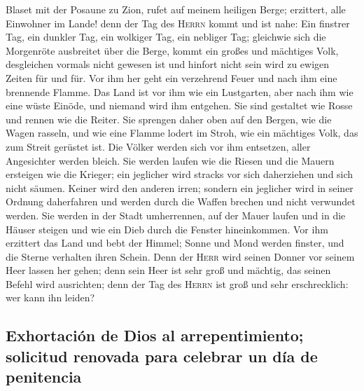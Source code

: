  Blaset mit der Posaune zu Zion, rufet auf meinem heiligen
Berge; erzittert, alle Einwohner im Lande! denn der Tag des
\textsc{Herrn} kommt und ist nahe:  Ein finstrer Tag, ein
dunkler Tag, ein wolkiger Tag, ein nebliger Tag; gleichwie sich die
Morgenröte ausbreitet über die Berge, kommt ein großes und mächtiges
Volk, desgleichen vormals nicht gewesen ist und hinfort nicht sein wird
zu ewigen Zeiten für und für.  Vor ihm her geht ein
verzehrend Feuer und nach ihm eine brennende Flamme. Das Land ist vor
ihm wie ein Lustgarten, aber nach ihm wie eine wüste Einöde, und niemand
wird ihm entgehen.  Sie sind gestaltet wie Rosse und
rennen wie die Reiter.  Sie sprengen daher oben auf den
Bergen, wie die Wagen rasseln, und wie eine Flamme lodert im Stroh, wie
ein mächtiges Volk, das zum Streit gerüstet ist.  Die
Völker werden sich vor ihm entsetzen, aller Angesichter werden bleich.
 Sie werden laufen wie die Riesen und die Mauern ersteigen
wie die Krieger; ein jeglicher wird stracks vor sich daherziehen und
sich nicht säumen.  Keiner wird den anderen irren; sondern
ein jeglicher wird in seiner Ordnung daherfahren und werden durch die
Waffen brechen und nicht verwundet werden.  Sie werden in
der Stadt umherrennen, auf der Mauer laufen und in die Häuser steigen
und wie ein Dieb durch die Fenster hineinkommen.  Vor ihm
erzittert das Land und bebt der Himmel; Sonne und Mond werden finster,
und die Sterne verhalten ihren Schein.  Denn der
\textsc{Herr} wird seinen Donner vor seinem Heer lassen her gehen; denn
sein Heer ist sehr groß und mächtig, das seinen Befehl wird ausrichten;
denn der Tag des \textsc{Herrn} ist groß und sehr erschrecklich: wer
kann ihn leiden?

\hypertarget{exhortaciuxf3n-de-dios-al-arrepentimiento-solicitud-renovada-para-celebrar-un-duxeda-de-penitencia}{%
\subsection{Exhortación de Dios al arrepentimiento; solicitud renovada
para celebrar un día de
penitencia}\label{exhortaciuxf3n-de-dios-al-arrepentimiento-solicitud-renovada-para-celebrar-un-duxeda-de-penitencia}}

